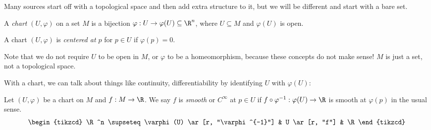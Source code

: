 \documentclass[a4paper]{article}
\begin{document}
Many sources start off with a topological space and then add extra structure to it, but we will be different and start with a bare set.
\begin{defi}[Chart]
  A \emph{chart} $(U, \varphi)$ on a set $M$ is a bijection $\varphi: U \to \varphi(U) \subseteq \R^n$, where $U \subseteq M$ and $\varphi(U)$ is open.

  A chart $(U, \varphi)$ is \emph{centered at $p$} for $p \in U$ if $\varphi(p) = 0$.
\end{defi}
Note that we do not require $U$ to be open in $M$, or $\varphi$ to be a homeomorphism, because these concepts do not make sense! $M$ is just a set, not a topological space.
\begin{center}
\end{center}
With a chart, we can talk about things like continuity, differentiability by identifying $U$ with $\varphi(U)$:
\begin{defi}
  Let $(U, \varphi)$ be a chart on $M$ and $f: M \to \R$. We say $f$ is \emph{smooth} or $C^\infty$ at $p \in U$ if $f \circ \varphi^{-1}: \varphi(U) \to \R$ is smooth at $\varphi(p)$ in the usual sense.
  \[
    \begin{tikzcd}
      \R^n \supseteq \varphi(U) \ar[r, "\varphi^{-1}"] & U \ar[r, "f"] & \R
    \end{tikzcd}
  \]
\end{defi}
\end{document}
